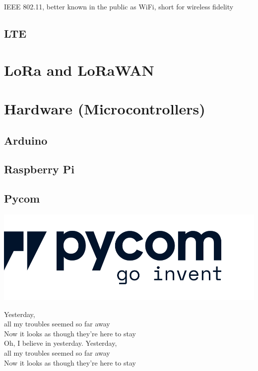 		IEEE 802.11, better known in the public as WiFi, short for wireless fidelity
	
		\subsection{LTE}
		
		
	
	\section{LoRa and LoRaWAN}
	
	\section{Hardware (Microcontrollers)}
	
		\subsection{Arduino}
		
		\subsection{Raspberry Pi}
		
		\subsection{Pycom}
		
			\noindent
			\begin{minipage}{0.5\textwidth}%
				\includegraphics[width=\textwidth]{resources/img/pycom-logo-new-rp1}
			\end{minipage}%
			\hfill%
			\begin{minipage}{0.55\textwidth}\raggedright
				Yesterday,\\
				all my troubles seemed so far away\\
				Now it looks as though they're here to stay\\
				Oh, I believe in yesterday.				Yesterday,\\
				all my troubles seemed so far away\\
				Now it looks as though they're here to stay\\
			\end{minipage}
		
			